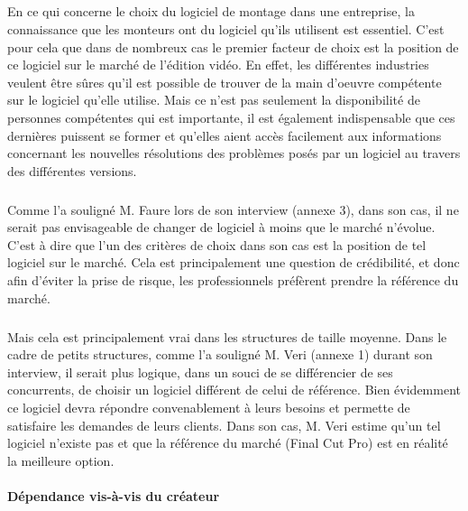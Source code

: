 \subparagraph{}

En ce qui concerne le choix du logiciel de montage dans une entreprise,
la connaissance que les monteurs ont du logiciel qu'ils utilisent est
essentiel.  C'est pour cela que dans de nombreux cas le premier facteur
de choix est la position de ce logiciel sur le marché de l'édition
vidéo. En effet, les différentes industries veulent être sûres qu'il
est possible de trouver de la main d'oeuvre compétente sur le logiciel
qu'elle utilise.  Mais ce n'est pas seulement la disponibilité de
personnes compétentes qui est importante, il est également indispensable
que ces dernières puissent se former et qu'elles aient accès facilement
aux informations concernant les nouvelles résolutions des problèmes
posés par un logiciel au travers des différentes versions.


\subparagraph{}

Comme l'a souligné M. Faure lors de son interview
(annexe 3), dans son cas, il ne serait pas envisageable de changer de
logiciel à moins que le marché n'évolue. C'est à dire que l'un des
critères de choix dans son cas est la position de tel logiciel sur
le marché. Cela est principalement une question de crédibilité, et
donc afin d'éviter la prise de risque, les professionnels préfèrent
prendre la référence du marché.

\subparagraph{}

Mais cela est principalement vrai dans les structures de taille moyenne.
Dans le cadre de petits structures, comme l'a souligné M. Veri (annexe
1) durant son interview, il serait plus logique, dans un souci de se
différencier de ses concurrents, de choisir un logiciel différent
de celui de référence. Bien évidemment ce logiciel devra répondre
convenablement à leurs besoins et permette de satisfaire les demandes de
leurs clients. Dans son cas, M. Veri estime qu'un tel logiciel n'existe
pas et que la référence du marché (Final Cut Pro) est en réalité
la meilleure option.

\paragraph{Dépendance vis-à-vis du créateur}

\subparagraph{}

